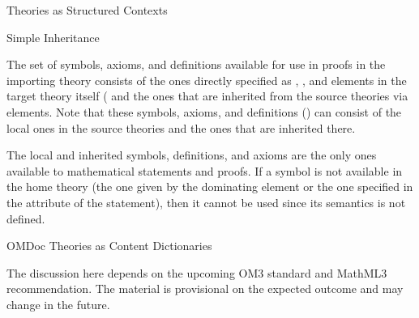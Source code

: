 \begin{omgroup}[short=Mathematical Statements,id=statements]
\begin{omgroup}[id=theories-contexts]{Theories as Structured Contexts}
\begin{module}[id=theories]
\begin{omgroup}[id=inheritance]{Simple Inheritance}
\begin{omtext}
  The set of symbols, axioms, and definitions available for use in proofs in the importing
  theory consists of the ones directly specified as , ,
  and  elements in the target theory itself ( and the ones that are inherited from
  the source theories via  elements.  Note that these symbols, axioms,
  and definitions () can consist of the local
  ones in the source theories and the ones that are inherited there.
\end{omtext}

The local and inherited symbols, definitions, and axioms are the only ones
available to mathematical statements and proofs. If a symbol is not available in
the home theory (the one given by the dominating  element or the
one specified in the  attribute of the statement),
then it cannot be used since its semantics is not defined.
\end{omgroup}

\begin{omgroup}[id=identifying]{OMDoc Theories as Content Dictionaries}
\begin{oldpart}{The discussion here depends on the upcoming OM3 standard and MathML3
    recommendation. The material is provisional on the expected outcome and may change in
    the future.}



\end{oldpart}
\end{omgroup}
\end{module}
\end{omgroup}
\end{omgroup}
